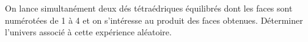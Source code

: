 
On lance simultanément deux dés tétraédriques équilibrés dont les faces sont numérotées de 1 à 4 et on s'intéresse au produit des faces obtenues. Déterminer l'univers associé à cette expérience aléatoire.